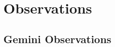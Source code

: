 \documentclass[12pt,preprint]{aastex}
\begin{document}
\section{Observations}






\subsection{Gemini Observations}
\end{document}
